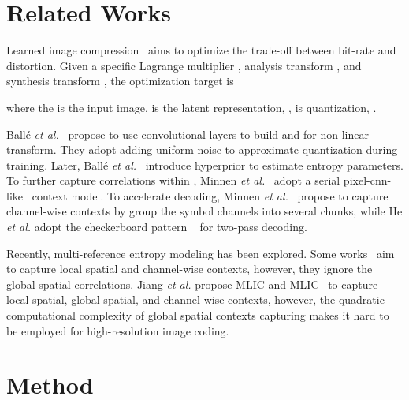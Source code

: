 \documentclass{article}
\theoremstyle{plain}
\theoremstyle{definition}
\theoremstyle{remark}
\begin{document}
  \section{Related Works}
  \label{sec:related}
  Learned image compression~\cite{theis2017lossy, balle2020nonlinear} aims to optimize the trade-off between 
  bit-rate and distortion. Given a specific Lagrange multiplier ,
  analysis transform , and synthesis transform ,
  the optimization target is 
  
  where the  is the input image,  is the
  latent representation, , is 
  quantization, .\par
  Ball{\'e} \textit{et al.}~\cite{balle2016end} propose to use convolutional layers
  to build  and  for non-linear transform. They adopt adding 
  uniform noise  to approximate quantization during training.
  Later, Ball{\'e} \textit{et al.}~\cite{balle2018variational} introduce hyperprior  to estimate entropy parameters.
  To further capture correlations within ,
  Minnen \textit{et al.}~\cite{minnen2018joint} adopt a serial
  pixel-cnn-like~\cite{van2016conditional} context model.
  To accelerate decoding,
  Minnen \textit{et al.}~\cite{minnen2020channel} propose to capture
  channel-wise contexts by group the symbol channels into several chunks,
  while He \textit{et al.} adopt the checkerboard pattern
  ~\cite{he2021checkerboard} for two-pass decoding.\par
  Recently, multi-reference entropy modeling has been explored.
  Some works~\cite{ma2021cross,he2022elic} aim to capture local spatial and channel-wise contexts,
  however, they ignore the global spatial correlations.
  Jiang \textit{et al.} propose MLIC and MLIC~\cite{jiang2022mlic}
  to capture local spatial, global spatial, and channel-wise contexts, 
  however, the quadratic computational complexity of global spatial contexts
  capturing makes it hard to be employed for high-resolution image coding.
  \section{Method}
  \label{sec:method}
\end{document}
